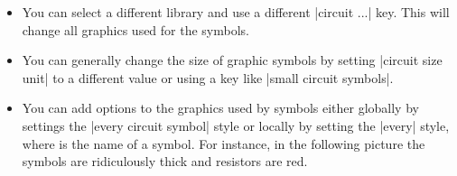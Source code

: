 \begin{itemize}
\item You can select a different library and use a different
  |circuit ...| key. This will change all graphics used for the
  symbols.
\item You can generally change the size of graphic symbols by setting
  |circuit size unit| to a different value or using a key like
  |small circuit symbols|.
\item
  You can add options to the graphics used by symbols either globally
  by settings the |every circuit symbol| style or locally by setting the
  |every|  style, where  is the name of a
  symbol. For instance, in the following picture the symbols are
  ridiculously thick and resistors are red.
\begin{codeexample}[]
\begin{tikzpicture}
  [circuit ee IEC,
   every symbol/.style={ultra thick},
   every resistor/.style={red}]


\end{tikzpicture}
\end{codeexample}
\end{itemize}
